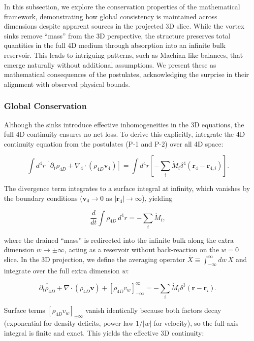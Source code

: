 In this subsection, we explore the conservation properties of the mathematical framework, demonstrating how global consistency is maintained across dimensions despite apparent sources in the projected 3D slice. While the vortex sinks remove ``mass'' from the 3D perspective, the structure preserves total quantities in the full 4D medium through absorption into an infinite bulk reservoir. This leads to intriguing patterns, such as Machian-like balances, that emerge naturally without additional assumptions. We present these as mathematical consequences of the postulates, acknowledging the surprise in their alignment with observed physical bounds.

\subsubsection{Global Conservation}
Although the sinks introduce effective inhomogeneities in the 3D equations, the full 4D continuity ensures no net loss. To derive this explicitly, integrate the 4D continuity equation from the postulates (P-1 and P-2) over all 4D space:

\begin{equation}
\int d^4 r \left[ \partial_t \rho_{4D} + \nabla_4 \cdot (\rho_{4D} \mathbf{v}_4) \right] = \int d^4 r \left[ -\sum_i \dot{M}_i \delta^4(\mathbf{r}_4 - \mathbf{r}_{4,i}) \right].
\end{equation}

The divergence term integrates to a surface integral at infinity, which vanishes by the boundary conditions ($\mathbf{v}_4 \to 0$ as $|\mathbf{r}_4| \to \infty$), yielding

\begin{equation}
\frac{d}{dt} \int \rho_{4D} \, d^4 r = -\sum_i \dot{M}_i,
\end{equation}

where the drained ``mass'' is redirected into the infinite bulk along the extra dimension $w \to \pm \infty$, acting as a reservoir without back-reaction on the $w=0$ slice. In the 3D projection, we define the averaging operator $\overline{X} \equiv \int_{-\infty}^{\infty} dw \, X$ and integrate over the full extra dimension $w$:

\[
\overline{\partial_t \rho_{4D}} + \nabla \cdot (\overline{\rho_{4D} \mathbf{v}}) + [\rho_{4D} v_w]_{-\infty}^{\infty} = -\sum_i \dot{M}_i \delta^3(\mathbf{r} - \mathbf{r}_i).
\]

Surface terms $[\rho_{4D} v_w]_{\pm \infty}$ vanish identically because both factors decay (exponential for density deficits, power law $1/|w|$ for velocity), so the full-axis integral is finite and exact. This yields the effective 3D continuity:

